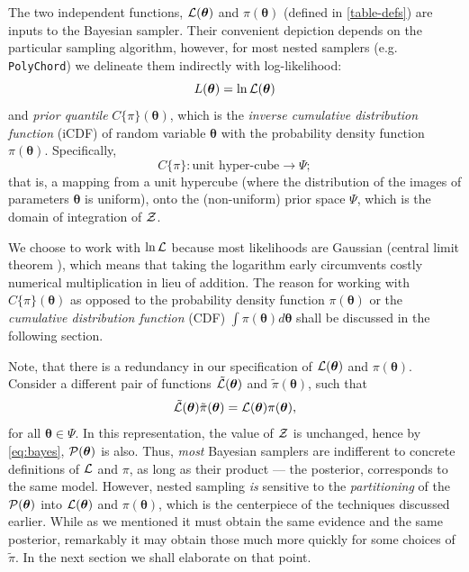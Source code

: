 \documentclass[usenatbib]{mnras}
\begin{document}
The two independent functions, \({\cal L}(\bm{\theta})\) and
\(\pi(\bm{\theta})\) (defined in \autoref{table-defs}) are inputs to the
Bayesian sampler. Their convenient depiction depends on the
particular sampling algorithm, however, for most nested samplers
(e.g. \texttt{PolyChord}) we delineate them indirectly with log-likelihood:
\begin{equation*}
  L(\bm{\theta}) = \ln \cal L (\bm{\theta})
\end{equation*}
and \emph{prior quantile} \(C\{\pi\}(\bm{\theta})\), which is the
\emph{inverse cumulative distribution function} (iCDF) of random
variable \(\bm{\theta}\) with the probability density function
\(\pi(\bm{\theta})\). Specifically,
\begin{equation*}
 C\{\pi\} : \text{unit hyper-cube} \rightarrow \Psi;
\end{equation*}
that is, a mapping from a unit hypercube (where the distribution of
the images of parameters \(\bm{\theta}\) is uniform), onto the
(non-uniform) prior space \(\Psi\), which is the domain of
integration of \({\cal Z}\).

We choose to work with \(\ln {\cal L}\) because most likelihoods are
Gaussian (central limit theorem \cite{central-limit-theorem}), which
means that taking the logarithm early circumvents costly
numerical multiplication in lieu of addition. The reason for
working with \(C\{\pi\}(\bm{\theta})\) as opposed to the
probability density function \(\pi(\bm{\theta})\) or the
\emph{cumulative distribution function} (CDF) \(\int \pi(\bm{\theta})
   d\bm{\theta}\) shall be discussed in the following section.

Note, that there is a redundancy in our specification of \({\cal
   L}(\bm{\theta})\) and \(\pi(\bm{\theta})\).  Consider a
different pair of functions \(\tilde{{\cal L}}(\bm{\theta})\) and
\(\tilde{\pi}(\bm{\theta})\), such that
\begin{equation}\label{eq:redundancy}
  \tilde{\cal L}(\bm{\theta}) \tilde{\pi}(\bm{\theta}) = \cal L (\bm{\theta}) \pi (\bm{\theta}), 
\end{equation}
for all \(\bm{\theta} \in \Psi\). In this representation, the
value of \({\cal Z}\) is unchanged, hence by \autoref{eq:bayes},
\({\cal P}(\bm{\theta})\) is also. Thus, \emph{most} Bayesian samplers
are indifferent to concrete definitions of \(\cal L\) and \(\pi\),
as long as their product --- the posterior, corresponds to the same
model. However, nested sampling \emph{is} sensitive to the
\emph{partitioning} of the \({\cal P} (\bm{\theta})\) into \({\cal L}(\bm{\theta})\)
and \(\pi(\bm{\theta})\), which is the centerpiece of the techniques
discussed earlier. While as we mentioned it must obtain the same
evidence and the same posterior, remarkably it may obtain those
much more quickly for some choices of \(\tilde{\pi}\). In the next
section we shall elaborate on that point.
\end{document}

